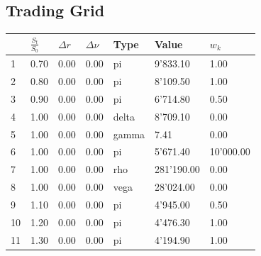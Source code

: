 \documentclass[12pt]{article}
\begin{document}
 
\begin{center} 
 \section{Trading Grid} 
 \par 
 \begin{scriptsize} 
 \begin{tabular}{p{15.0 mm}|p{15.0 mm}|p{15.0 mm}|p{15.0 mm}|p{15.0 mm}|p{15.0 mm}|p{15.0 mm}} 
          & $\frac{S_t}{S_0}$ & $\Delta r$ & $\Delta \nu$ &     Type &    Value &    $w_k$ \\ \hline 
1 & 0.70& 0.00& 0.00& pi& 9'833.10& 1.00\\ 
2 & 0.80& 0.00& 0.00& pi& 8'109.50& 1.00\\ 
3 & 0.90& 0.00& 0.00& pi& 6'714.80& 0.50\\ 
4 & 1.00& 0.00& 0.00& delta& 8'709.10& 0.00\\ 
5 & 1.00& 0.00& 0.00& gamma& 7.41& 0.00\\ 
6 & 1.00& 0.00& 0.00& pi& 5'671.40& 10'000.00\\ 
7 & 1.00& 0.00& 0.00& rho& 281'190.00& 0.00\\ 
8 & 1.00& 0.00& 0.00& vega& 28'024.00& 0.00\\ 
9 & 1.10& 0.00& 0.00& pi& 4'945.00& 0.50\\ 
10 & 1.20& 0.00& 0.00& pi& 4'476.30& 1.00\\ 
11 & 1.30& 0.00& 0.00& pi& 4'194.90& 1.00\\ 
\end{tabular} 
  \end{scriptsize} 
 \end{center}
\end{document}
